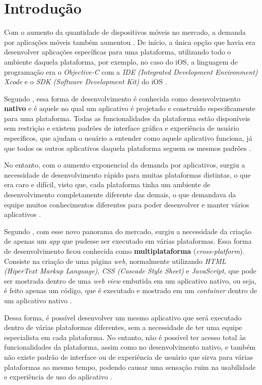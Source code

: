 \chapter{Introdução} \label{cap:introducao}

Com o aumento da quantidade de dispositivos móveis no mercado, a demanda por aplicações móveis também aumentou \cite{cevallos_case_2014}.
De início, a única opção que havia era desenvolver aplicações específicas para uma plataforma, utilizando todo o ambiente daquela plataforma, por exemplo,
no caso do iOS, a linguagem de programação era o \textit{Objective-C} com a \textit{IDE (Integrated Development Environment) Xcode} e o \textit{SDK (Software Development Kit)} do iOS \cite{heitkotter_comparing_2013}.

Segundo , essa forma de desenvolvimento é conhecida como desenvolvimento \textbf{nativo} e é aquele no qual um aplicativo é projetado e construído especificamente para uma plataforma. 
Todas as funcionalidades da plataforma estão disponíveis sem restrição e existem padrões de interface gráfica e experiência de usuário específicos, que ajudam o usuário a 
entender como aquele aplicativo funciona, já que todos os outros aplicativos daquela plataforma seguem os mesmos padrões \cite{corral_ant_2012}. 

No entanto, com o aumento exponencial da demanda por aplicativos, surgiu a necessidade de desenvolvimento rápido para muitas plataformas distintas, o que era caro e difícil,
visto que, cada plataforma tinha um ambiente de desenvolvimento completamente diferente das demais, o que demandava da equipe muitos conhecimentos diferentes
para poder desenvolver e manter vários aplicativos \cite{prezotto_estudo_2014}.

Segundo , com esse novo panorama do mercado, surgiu a necessidade da criação de apenas um \textit{app} que pudesse ser executado 
em várias plataformas. Essa forma de desenvolvimento ficou conhecida como \textbf{multiplataforma} (\textit{cross-platform}). 
Consiste na criação de uma página \textit{web}, normalmente utilizando \textit{HTML (HiperText Markup Language)}, \textit{CSS (Cascade Style Sheet)} e \textit{JavaScript}, que pode ser mostrada dentro de uma \textit{web view} 
embutida em um aplicativo nativo, ou seja, é feito apenas um código, que é executado e mostrado em um \textit{container} dentro de um aplicativo nativo \cite{stark_building_2010, heitkotter_comparing_2013}. 

Dessa forma, é possível desenvolver um mesmo aplicativo que será executado dentro de várias plataformas diferentes, sem a necessidade de ter uma equipe especialista em cada plataforma.
No entanto, não é possível ter acesso total às funcionalidades da plataforma, assim como no desenvolvimento nativo, e também não existe padrão de interface ou de experiência de usuário que sirva
para várias plataformas ao mesmo tempo, podendo causar uma sensação ruim na usabilidade e experiência de uso do aplicativo \cite{corral_ant_2012}.

